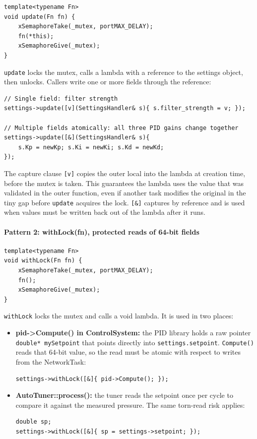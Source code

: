 \begin{lstlisting}[caption=SettingsHandler::update - Locked Write]
template<typename Fn>
void update(Fn fn) {
    xSemaphoreTake(_mutex, portMAX_DELAY);
    fn(*this);
    xSemaphoreGive(_mutex);
}
\end{lstlisting}

\texttt{update} locks the mutex, calls a lambda with a reference to the settings object,
then unlocks. Callers write one or more fields through the reference:

\begin{lstlisting}[caption=Using update()]
// Single field: filter strength
settings->update([v](SettingsHandler& s){ s.filter_strength = v; });

// Multiple fields atomically: all three PID gains change together
settings->update([&](SettingsHandler& s){
    s.Kp = newKp; s.Ki = newKi; s.Kd = newKd;
});
\end{lstlisting}

The capture clause \texttt{[v]} copies the outer local into the lambda at creation time,
before the mutex is taken. This guarantees the lambda uses the value that was validated
in the outer function, even if another task modifies the original in the tiny gap before
\texttt{update} acquires the lock. \texttt{[\&]} captures by reference and is used when
values must be written back out of the lambda after it runs.

\paragraph{Pattern 2: withLock(fn), protected reads of 64-bit fields}

\begin{lstlisting}[caption=SettingsHandler::withLock - Locked Read]
template<typename Fn>
void withLock(Fn fn) {
    xSemaphoreTake(_mutex, portMAX_DELAY);
    fn();
    xSemaphoreGive(_mutex);
}
\end{lstlisting}

\texttt{withLock} locks the mutex and calls a void lambda. It is used in two places:

\begin{itemize}
    \item \textbf{pid->Compute() in ControlSystem:} the PID library holds a raw pointer
          \texttt{double* mySetpoint} that points directly into \texttt{settings.setpoint}.
          \texttt{Compute()} reads that 64-bit value, so the read must be atomic with
          respect to writes from the NetworkTask:
\begin{lstlisting}[caption=Locked PID Computation]
settings->withLock([&]{ pid->Compute(); });
\end{lstlisting}
    \item \textbf{AutoTuner::process():} the tuner reads the setpoint once per cycle to
          compare it against the measured pressure. The same torn-read risk applies:
\begin{lstlisting}[caption=Locked Setpoint Read]
double sp;
settings->withLock([&]{ sp = settings->setpoint; });
\end{lstlisting}
\end{itemize}

